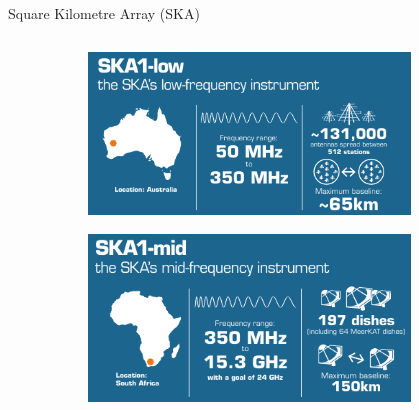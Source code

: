 \documentclass[xetex,aspectratio=169]{beamer}
\begin{document}
	\begin{frame}{Square Kilometre Array (SKA)}
		\begin{columns}
			\begin{column}{0.48\textwidth}
				\begin{figure}
					\centering
					\begin{subfigure}[b]{\textwidth}
						\centering
						\includegraphics[width=\textwidth, height=0.41\textheight, keepaspectratio]{./figures/ska/ska_low.png}
					\end{subfigure}
					
					\begin{subfigure}[b]{\textwidth}
						\centering
						\includegraphics[width=\textwidth, height=0.41\textheight, keepaspectratio]{./figures/ska/ska_mid.png}
					\end{subfigure}
				\end{figure}
			\end{column}
			\begin{column}{0.48\textwidth}
			\end{column}
		\end{columns}
	\end{frame}
\end{document}
